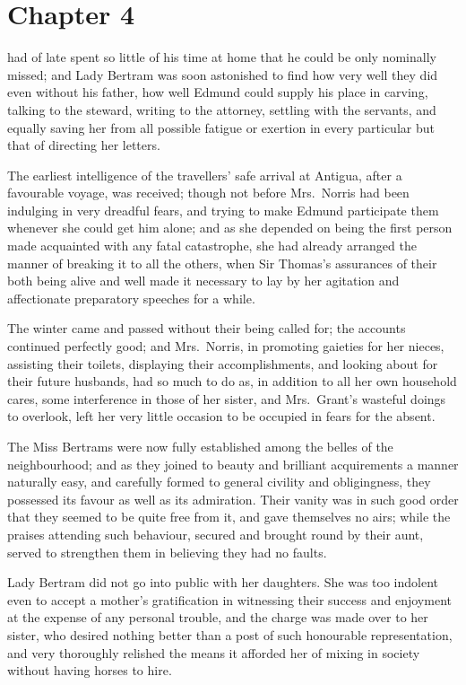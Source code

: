 \chapter{Chapter 4}

 had of late spent so little of his time at
home that he could be only nominally missed; and Lady
Bertram was soon astonished to find how very well they
did even without his father, how well Edmund could
supply his place in carving, talking to the steward,
writing to the attorney, settling with the servants,
and equally saving her from all possible fatigue or exertion
in every particular but that of directing her letters.

The earliest intelligence of the travellers' safe arrival
at Antigua, after a favourable voyage, was received;
though not before Mrs.\ Norris had been indulging in very
dreadful fears, and trying to make Edmund participate them
whenever she could get him alone; and as she depended
on being the first person made acquainted with any
fatal catastrophe, she had already arranged the manner of
breaking it to all the others, when Sir Thomas's assurances
of their both being alive and well made it necessary to lay
by her agitation and affectionate preparatory speeches for a while.

The winter came and passed without their being
called for; the accounts continued perfectly good;
and Mrs.\ Norris, in promoting gaieties for her nieces,
assisting their toilets, displaying their accomplishments,
and looking about for their future husbands, had so much
to do as, in addition to all her own household cares,
some interference in those of her sister, and Mrs.\ Grant's
wasteful doings to overlook, left her very little occasion
to be occupied in fears for the absent.

The Miss Bertrams were now fully established among the
belles of the neighbourhood; and as they joined to beauty
and brilliant acquirements a manner naturally easy,
and carefully formed to general civility and obligingness,
they possessed its favour as well as its admiration.
Their vanity was in such good order that they seemed
to be quite free from it, and gave themselves no airs;
while the praises attending such behaviour, secured and
brought round by their aunt, served to strengthen them in
believing they had no faults.

Lady Bertram did not go into public with her daughters.
She was too indolent even to accept a mother's gratification
in witnessing their success and enjoyment at the expense
of any personal trouble, and the charge was made over
to her sister, who desired nothing better than a post
of such honourable representation, and very thoroughly
relished the means it afforded her of mixing in society
without having horses to hire.

